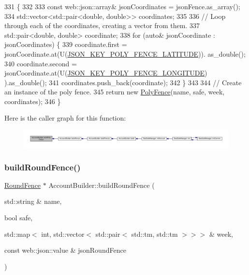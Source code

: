 \begin{DoxyCode}
331 \{
332 
333     \textcolor{keyword}{const} web::json::array& jsonCoordinates = jsonFence.as\_array();
334     std::vector<std::pair<double, double>> coordinates;
335 
336     \textcolor{comment}{// Loop through each of the coordinates, creating a vector from them.}
337     std::pair<double, double> coordinate;
338     \textcolor{keywordflow}{for} (\textcolor{keyword}{auto}& jsonCoordinate : jsonCoordinates) \{
339         coordinate.first = jsonCoordinate.at(U(\hyperlink{_poly_fence_8h_a9a8bf08118a4bda10ed5efe8cf534024}{JSON\_KEY\_POLY\_FENCE\_LATITUDE})).
      as\_double();
340         coordinate.second = jsonCoordinate.at(U(\hyperlink{_poly_fence_8h_a7411c3395f017461cb1bf07687ee4ef3}{JSON\_KEY\_POLY\_FENCE\_LONGITUDE})
      ).as\_double();
341         coordinates.push\_back(coordinate);
342     \}
343 
344     \textcolor{comment}{// Create an instance of the poly fence.}
345     \textcolor{keywordflow}{return} \textcolor{keyword}{new} \hyperlink{class_poly_fence}{PolyFence}(name, safe, week, coordinates);
346 \}
\end{DoxyCode}
Here is the caller graph for this function\+:
\nopagebreak
\begin{figure}[H]
\begin{center}
\leavevmode
\includegraphics[width=350pt]{d9/daa/class_account_builder_a9a93946d8ba8908f6bcfa6b793cc6277_icgraph}
\end{center}
\end{figure}
\mbox{\label{class_account_builder_a0223a0830ba9a0e707c5a2bd5d74ee50}} 
\subsubsection{\texorpdfstring{build\+Round\+Fence()}{buildRoundFence()}}
{\footnotesize\ttfamily \hyperlink{class_round_fence}{Round\+Fence} $\ast$ Account\+Builder\+::build\+Round\+Fence (\begin{DoxyParamCaption}\item[{std\+::string \&}]{name,  }\item[{bool}]{safe,  }\item[{std\+::map$<$ int, std\+::vector$<$ std\+::pair$<$ std\+::tm, std\+::tm $>$$>$$>$ \&}]{week,  }\item[{const web\+::json\+::value \&}]{json\+Round\+Fence }\end{DoxyParamCaption})\hspace{0.3cm}{\ttfamily [private]}}

